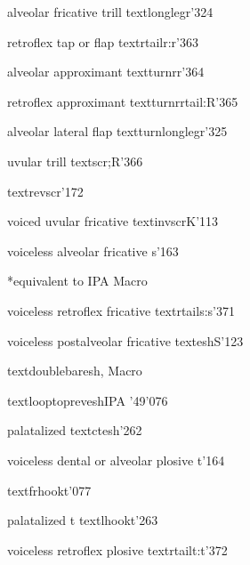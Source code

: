 %
  {alveolar fricative trill}%
  {\tbs textlonglegr}{}{\ipaold}{'324}

%
  {retroflex tap or flap}%
  {\tbs textrtailr}{\tbs:r}{\ipaall}{'363}

%
  {alveolar approximant}%
  {\tbs textturnr}{\tbs*r}{\ipaall}{'364}

%
  {retroflex approximant}%
  {\tbs textturnrrtail}{\tbs:R}{\ipaall}{'365}

%
  {alveolar lateral flap}%
  {\tbs textturnlonglegr}{}{\ipaall}{'325}

%
  {uvular trill}%
  {\tbs textscr}{\tbs;R}{\ipaall}{'366}

%
  {}%
  {\tbs textrevscr}{}{\PSG}{'172}

%
  {voiced uvular fricative}%
  {\tbs textinvscr}{K}{\ipaall}{'113}

%
  {voiceless alveolar fricative}%
  {s}{}{\ipaall}{'163}

%
  {*equivalent to IPA \textesh}%
  {}{}{\PSG}{Macro}

%
  {voiceless retroflex fricative}%
  {\tbs textrtails}{\tbs:s}{\ipaall}{'371}

%
  {voiceless postalveolar fricative}%
  {\tbs textesh}{S}{\ipaall}{'123}

%
  {}%
  {\tbs textdoublebaresh}{}{\cite{Hottentot}, \PSG}{Macro}

%
  {}%
  {\tbs textlooptoprevesh}{}{IPA '49}{'076}

%
  {palatalized \textesh}%
  {\tbs textctesh}{}{\ipaold}{'262}

%
  {voiceless dental or alveolar plosive}%
  {t}{}{\ipaall}{'164}

%
  {}%
  {\tbs textfrhookt}{}{\PSG}{'077}

%
  {palatalized t}%
  {\tbs textlhookt}{}{\PSG}{'263}

%
  {voiceless retroflex plosive}%
  {\tbs textrtailt}{\tbs:t}{\ipaall}{'372}

